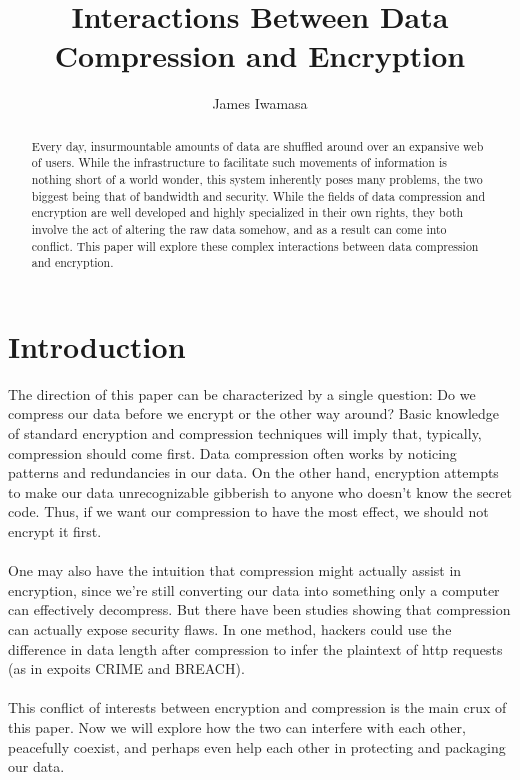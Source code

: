 \documentclass[11pt]{article}
\begin{document}
\title{Interactions Between Data Compression and Encryption}
\author{James Iwamasa}
\maketitle

\begin{abstract}
Every day, insurmountable amounts of data are shuffled around over an expansive web of users. 
While the infrastructure to facilitate such movements of information is nothing short of a world wonder, 
this system inherently poses many problems, the two biggest being that of bandwidth and security. 
While the fields of data compression and encryption are well developed and highly specialized in their 
own rights, they both involve the act of altering the raw data somehow, and as a result can come into 
conflict. This paper will explore these complex interactions between data compression and encryption.
\end{abstract}


\section{Introduction}\label{intro-sect}
The direction of this paper can be characterized by a single question: Do we compress our data before we 
encrypt or the other way around? Basic knowledge of standard encryption and compression techniques will 
imply that, typically, compression should come first. Data compression often works by noticing patterns and 
redundancies in our data. On the other hand, encryption attempts to make our data unrecognizable gibberish 
to anyone who doesn't know the secret code. Thus, if we want our compression to have the most effect, 
we should not encrypt it first.\\\\
One may also have the intuition that compression might actually assist in encryption, 
since we're still converting our data into something only a computer can effectively decompress. 
But there have been studies\cite{kelsey, gluck} showing that compression can actually expose security flaws. 
In one method, hackers could use the difference in data length after compression to infer 
the plaintext of http requests (as in expoits CRIME and BREACH).\\\\
This conflict of interests between encryption and compression is the main crux of this paper. 
Now we will explore how the two can interfere with each other, peacefully coexist, and perhaps 
even help each other in protecting and packaging our data. 
\end{document}
